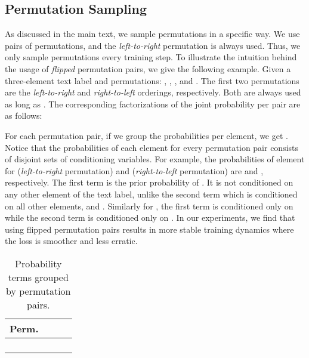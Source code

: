 \subsection{Permutation Sampling}
\label{sec:perm-sampling}

As discussed in the main text, we sample permutations in a specific way. We use pairs of permutations, and the \textit{left-to-right} permutation is always used. Thus, we only sample  permutations every training step. To illustrate the intuition behind the usage of \textit{flipped} permutation pairs, we give the following example. Given a three-element text label  and  permutations: , , , and . The first two permutations are the \textit{left-to-right} and \textit{right-to-left} orderings, respectively. Both are always used as long as . The corresponding factorizations of the joint probability per pair are as follows:


    


For each permutation pair, if we group the probabilities per element, we get . Notice that the probabilities of each element for every permutation pair consists of disjoint sets of conditioning variables. For example, the probabilities of element  for   (\textit{left-to-right} permutation) and  (\textit{right-to-left} permutation) are  and , respectively. The first term is the prior probability of . It is not conditioned on any other element of the text label, unlike the second term which is conditioned on all other elements,  and . Similarly for , the first term is conditioned only on  while the second term is conditioned only on . In our experiments, we find that using flipped permutation pairs results in more stable training dynamics where the loss is smoother and less erratic.

\begin{table}[ht]
  \centering
  \setlength{\tabcolsep}{6pt}
  \caption{Probability terms grouped by permutation pairs.}
  \begin{tabular}{ c | l l l }
    \toprule
    Perm. &  &  &  \\
    \midrule
     &  &  &  \\
     &  &  &  \\
    \midrule
     &  &  &  \\
     &  &  &  \\
    \bottomrule
  \end{tabular}
  \label{tab:grouped-probs}
\end{table}






